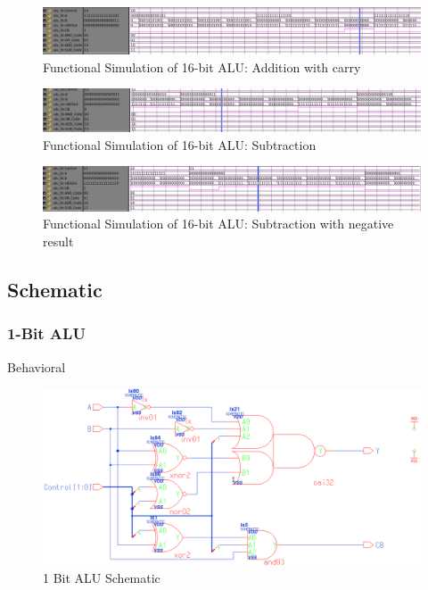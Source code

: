 \documentclass[11pt]{article}
\begin{document}
			\begin{figure}[H]
				\centering
				\includegraphics[width=0.7\linewidth]{"Pictures/16 Bit ALU Add Carry"}
				\caption{Functional Simulation of 16-bit ALU: Addition with carry}
				\label{fig:16-bit-alu-add-carry}
			\end{figure}
			
			
			\begin{figure}[H]
				\centering
				\includegraphics[width=0.7\linewidth]{"Pictures/16 Bit Alu Sub Pos"}
				\caption{Functional Simulation of 16-bit ALU: Subtraction}
				\label{fig:16-bit-alu-sub-pos}
			\end{figure}
			
			
			\begin{figure}[H]
				\centering
				\includegraphics[width=0.7\linewidth]{"Pictures/16 Bit ALU Sub Neg"}
				\caption{Functional Simulation of 16-bit ALU: Subtraction with negative result}
				\label{fig:16-bit-alu-sub-neg}
			\end{figure}

	\subsection{Schematic}

		\subsubsection{1-Bit ALU}	
		
			
			Behavioral
			
			\begin{figure}[H]
				\centering
				\includegraphics[width=0.7\linewidth]{"Pictures/ALU-1Bit Schematic"}
				\caption{1 Bit ALU Schematic}
				\label{fig:alu-1bit-schematic}
			\end{figure}
		
\end{document}
